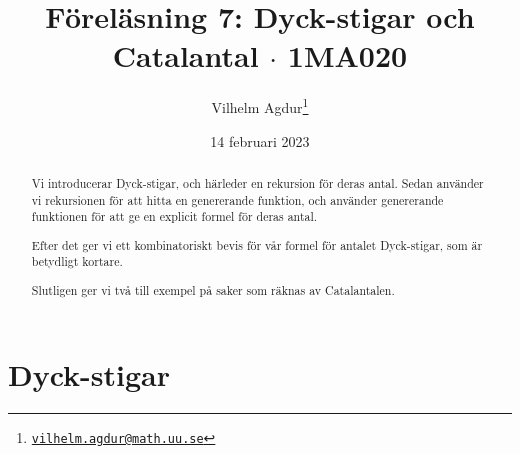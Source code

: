 \documentclass{tufte-handout}
\title{Föreläsning 7: Dyck-stigar och Catalantal $\cdot$ 1MA020}
\author[Vilhelm Agdur]{Vilhelm Agdur\thanks{\href{mailto:vilhelm.agdur@math.uu.se}{\nolinkurl{vilhelm.agdur@math.uu.se}}}}
\date{14 februari 2023}
\begin{document}

\maketitle%

\begin{abstract}
\noindent
Vi introducerar Dyck-stigar, och härleder en rekursion för deras antal. Sedan använder vi rekursionen för att hitta en genererande funktion, och använder genererande funktionen för att ge en explicit formel för deras antal.

Efter det ger vi ett kombinatoriskt bevis för vår formel för antalet Dyck-stigar, som är betydligt kortare.

Slutligen ger vi två till exempel på saker som räknas av Catalantalen.
\end{abstract}

\section{Dyck-stigar}
\end{document}
